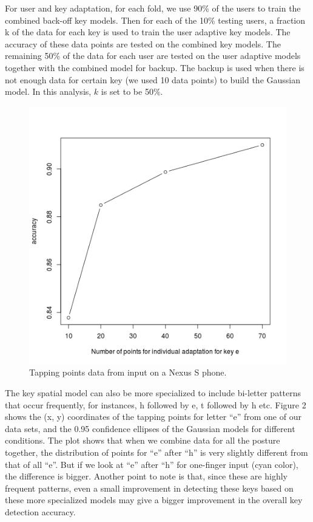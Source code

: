 \documentclass{sigchi}
\begin{document}
For user and key adaptation, for each fold, we use 90\% of the users to train the
combined back-off key models. Then for each of the 10\% testing users,  a
fraction k of the data for each key is used to train the user adaptive key
models. The accuracy of these data points are tested on the combined key models.
The remaining 50\% of the data for each user are tested on the user adaptive 
models together with the combined model for backup. The backup is used when 
there is not enough data for certain key (we used 10 data points) to build the 
Gaussian model. In this analysis, $k$ is set to be 50\%.

\begin{figure}[tb]
  \centering
  \includegraphics[width=1\columnwidth]{figures/user-adapt-e.png}
  \caption{Tapping points data from input on a Nexus S phone.}
  \label{fig:time-distance}
\end{figure}

The key spatial model can also be more specialized to include bi-letter patterns
that occur frequently, for instances, h followed by e, t followed by h etc. 
Figure 2 shows the (x, y) coordinates of the tapping points for letter “e” from 
one of our data sets, and the 0.95 confidence ellipses of the Gaussian models 
for different conditions. The plot shows that when we combine data for all the 
posture together, the distribution of points for “e” after “h” is very slightly 
different from that of all “e”. But if we look at “e” after “h” for one-finger input (cyan color), the difference is bigger. Another point to note is that, since these are highly frequent patterns, even a small improvement in detecting these keys based on these more specialized models may give a bigger improvement in the overall key detection accuracy.
\end{document}
